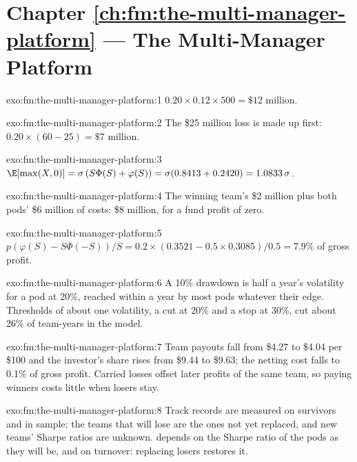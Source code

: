 \section*{Chapter \ref{ch:fm:the-multi-manager-platform} --- The Multi-Manager Platform}

\begin{solution}{exo:fm:the-multi-manager-platform:1}
$0.20\times0.12\times500=\$12$ million.
\end{solution}

\begin{solution}{exo:fm:the-multi-manager-platform:2}
The \$25 million loss is made up first: $0.20\times(60-25)=\$7$ million.
\end{solution}

\begin{solution}{exo:fm:the-multi-manager-platform:3}
$\E[\max(X,0)]=\sigma\,(S\Phi(S)+\varphi(S))=\sigma(0.8413+0.2420)=1.0833\,\sigma$.
\end{solution}

\begin{solution}{exo:fm:the-multi-manager-platform:4}
The winning team's \$2 million plus both pods' \$6 million of costs: \$8 million, for a fund profit of zero.
\end{solution}

\begin{solution}{exo:fm:the-multi-manager-platform:5}
$p(\varphi(S)-S\Phi(-S))/S=0.2\times(0.3521-0.5\times0.3085)/0.5=7.9\%$ of gross profit.
\end{solution}

\begin{solution}{exo:fm:the-multi-manager-platform:6}
A 10\% drawdown is half a year's volatility for a pod at 20\%, reached within a year by most pods whatever their edge. Thresholds of about one
volatility, a cut at 20\% and a stop at 30\%, cut about 26\% of team-years in the model.
\end{solution}

\begin{solution}{exo:fm:the-multi-manager-platform:7}
Team payouts fall from \$4.27 to \$4.04 per \$100 and the investor's share rises from \$9.44 to \$9.63; the netting cost falls to 0.1\% of gross
profit. Carried losses offset later profits of the same team, so paying winners costs little when losers stay.
\end{solution}

\begin{solution}{exo:fm:the-multi-manager-platform:8}
Track records are measured on survivors and in sample; the teams that will lose are the ones not yet replaced, and new teams' Sharpe ratios are
unknown.  depends on the Sharpe ratio of the pods as they will be, and on turnover: replacing losers restores it.
\end{solution}


